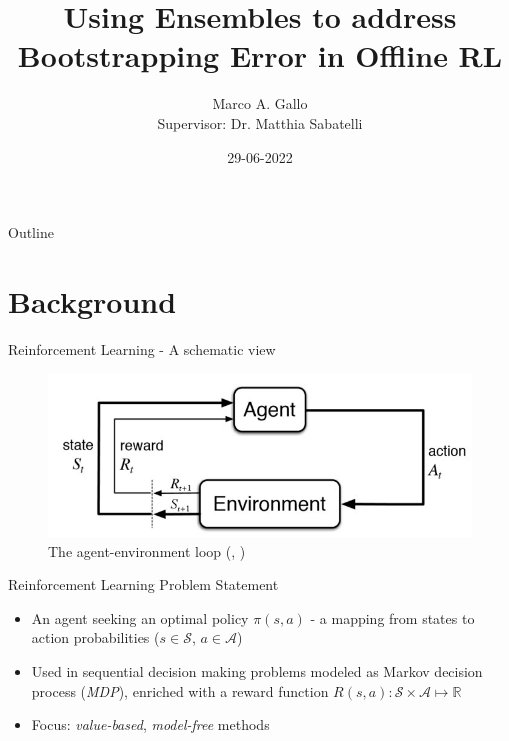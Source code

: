 \documentclass[presentation]{beamer}
\author[Marco A. Gallo]{Marco A. Gallo\\ \vspace{1mm}Supervisor: Dr. Matthia Sabatelli}
\institute[]{University of Groningen}
\date{29-06-2022}
\title{Using Ensembles to address Bootstrapping Error in Offline RL}
\begin{document}
\maketitle
\begin{frame}{Outline}
\tableofcontents
\end{frame}


\section{Background}
\label{sec:org8eff8cd}
\begin{frame}[label={sec:orgb976866}]{Reinforcement Learning - A schematic view}
\begin{figure}[htbp]
\centering
\includegraphics[width=\textwidth]{./online_rl_loop.jpg}
\caption{\label{fig:org5d2cec5}The agent-environment loop (\citeauthor{sutton2018reinforcement}, \citeyear{sutton2018reinforcement})}
\end{figure}
\end{frame}

\begin{frame}[label={sec:org2be580b}]{Reinforcement Learning Problem Statement}
\begin{itemize}
\item An agent seeking an optimal policy \(\pi(s, a)\) - a mapping from
states to action probabilities (\(s \in \mathcal{S}\), \(a \in \mathcal{A}\))
\item Used in sequential decision making problems modeled as Markov
decision process (\emph{MDP}), enriched with a reward function \(R(s, a)
  \colon \mathcal{S} \times \mathcal{A} \mapsto \mathbb{R}\)
\end{itemize}

\begin{itemize}
\item Focus: \emph{value-based}, \emph{model-free} methods
\end{itemize}
\end{frame}
\end{document}
